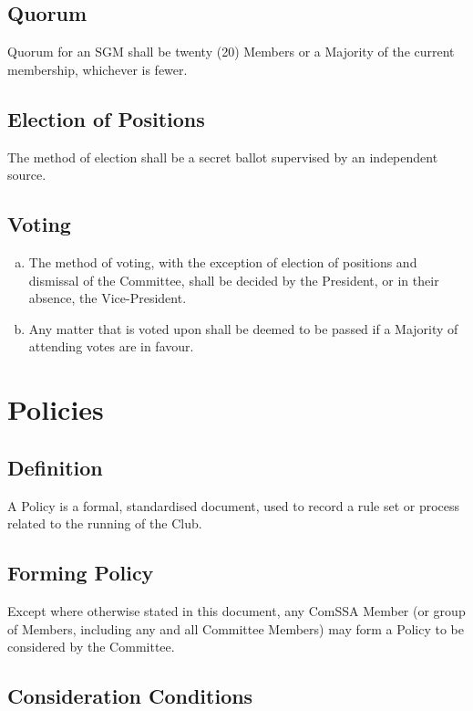 \documentclass[a4paper,12pt]{article}
\begin{document}
\subsection{Quorum}

Quorum for an SGM shall be twenty (20) Members or a Majority of the current membership, whichever is fewer.

\subsection{Election of Positions}

The method of election shall be a secret ballot supervised by an independent source.

\subsection{Voting}

\begin{enumerate}[a)]
	\item The method of voting, with the exception of election of positions and dismissal of the Committee, shall be decided by the President, or in their absence, the Vice-President.
	\item Any matter that is voted upon shall be deemed to be passed if a Majority of attending votes are in favour.
\end{enumerate}

\section{Policies}

\subsection{Definition}

A Policy is a formal, standardised document, used to record a rule set or process related to the running of the Club.

\subsection{Forming Policy}

Except where otherwise stated in this document, any ComSSA Member (or group of Members, including any and all Committee Members) may form a Policy to be considered by the Committee.

\subsection{Consideration Conditions}
\end{document}
